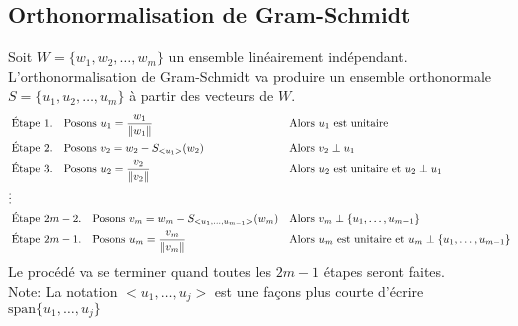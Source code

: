 \subsection{Orthonormalisation de Gram-Schmidt}
Soit $W = \{w_1, w_2, \dots, w_m\}$ un ensemble linéairement indépendant. L'orthonormalisation 
de Gram-Schmidt va produire un ensemble orthonormale $S = \{u_1, u_2, \dots, u_m\}$ à partir
des vecteurs de $W$. 
\begin{align*}
      &\text{Étape} \ 1. \quad \text{Posons} \ u_1 = \frac{w_1}{\left\lVert w_1\right\rVert}& &\text{Alors} \ u_1 \ \text{est unitaire} \\
      &\text{Étape} \ 2. \quad \text{Posons} \ v_2 = w_2 - S_{<u_1>}(w_2)& &\text{Alors} \ v_2 \perp u_1 \\
      &\text{Étape} \ 3. \quad \text{Posons} \ u_2 = \frac{v_2}{\left\lVert v_2\right\rVert}& &\text{Alors} \ u_2 \ \text{est unitaire et} \ u_2 \perp u_1 \\
      \vdots \\
      &\text{Étape} \ 2m - 2. \quad \text{Posons} \ v_{m} = w_{m} - S_{<u_1, \dots, u_{m - 1}>}(w_{m})& &\text{Alors} \ v_{m} \perp \{u_1, \dots, u_{m - 1}\} \\
      &\text{Étape} \ 2m - 1. \quad \text{Posons} \ u_{m} = \frac{v_{m}}{\left\lVert v_{m}\right\rVert} & &\text{Alors} \ u_{m} \ \text{est unitaire et} \ u_{m} \perp \{u_1, \dots, u_{m - 1}\}
\end{align*}
Le procédé va se terminer quand toutes les $2m - 1$ étapes seront faites. \\
Note: La notation $<u_1, \dots, u_j>$ est une façons plus courte d'écrire $\text{span}\{u_1, \dots, u_j\}$